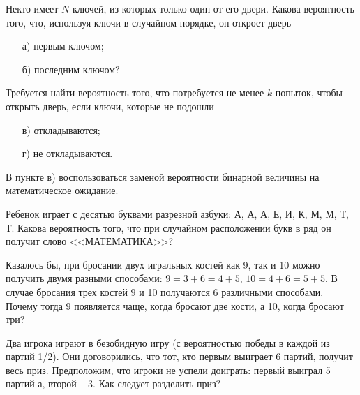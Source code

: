 

\begin{problem}
Некто имеет $N$ ключей, из которых только один от его двери. Какова вероятность того, что, используя ключи в случайном порядке, 
он откроет дверь 
\begin{enumerate}
\item[а)] первым ключом; 
\item[б)] последним ключом? 
\end{enumerate}
Требуется найти вероятность того, что потребуется не менее $k$ попыток, чтобы открыть дверь, если ключи, которые не подошли 
\begin{enumerate}
\item[в)] откладываются; 
\item[г)] не откладываются. 
\end{enumerate}

\begin{ordre}
В пункте в) воспользоваться заменой вероятности бинарной величины на математическое ожидание.
\end{ordre}

\end{problem}


\begin{problem}
Ребенок играет с десятью буквами разрезной азбуки: А, А, А, Е, И, К, М, М, Т, Т. 
Какова вероятность того, что при случайном расположении букв в ряд он получит слово <<МАТЕМАТИКА>>? 
\end{problem}


\begin{problem}
Казалось бы, при бросании двух игральных костей как 9, так и 10 можно получить двумя разными способами: $9 = 3+6 = 4+5$, $10 = 4+6 = 5+5$. В случае бросания трех костей 9 и 10 получаются 6 различными способами. Почему тогда 9 появляется чаще, когда бросают две кости, а 10, когда бросают три? 
\end{problem}



\begin{problem}
Два игрока играют в безобидную игру (с вероятностью победы в каждой из партий 1/2). Они договорились, что тот, кто первым выиграет 6 партий, получит  весь приз. Предположим, что игроки не успели доиграть: первый выиграл 5 партий а, второй -- 3. Как следует разделить приз?   
\end{problem}

